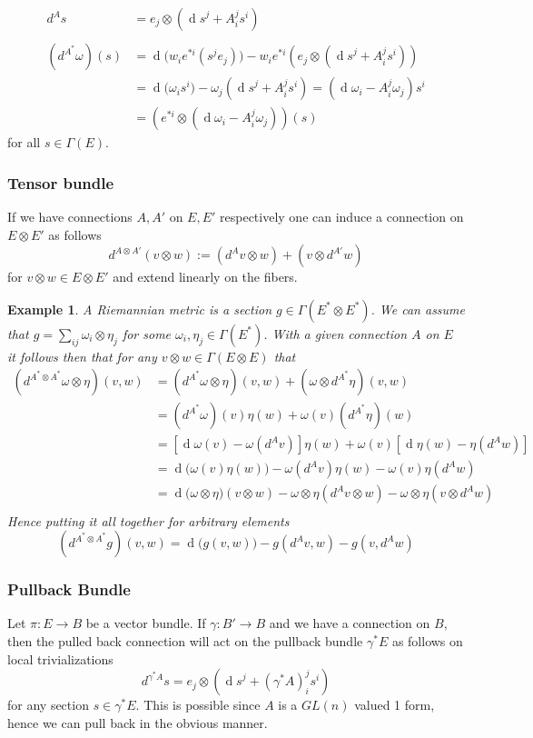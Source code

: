 \documentclass{article}
\numberwithin{theorem}{section}
\newtheorem*{example}{Example}
\renewcommand{\d}[1]{\ensuremath{\operatorname{d}\!{#1}}}
\newcommand{\1}{\mathds{1}}
\begin{document}
\begin{align*}
     d^A s &= e_j \otimes (\d s^j + A^{j}_i s^i ) \\ 
     \\
    (d^{A^*}\omega)(s) &= \d(w_ie^{*i}(s^je_j)) - w_i e^{*i}(e_j \otimes (\d s^j + A^j_i s^i)) \\
    &= \d(\omega_is^i) -\omega_j(\d s^j + A^j_i s^i)  = (\d \omega_i - A^{j}_i \omega_j) s^i \\
    &= \left( e^{*i}\otimes(\d \omega_i - A^j_i \omega_j)\right) (s)
\end{align*}
for all $ s\in \Gamma(E)$. 

\subsubsection{Tensor bundle}
If we have connections $A, A'$ on $E, E'$ respectively one can induce a connection on $E\otimes E'$ as follows 
\[ d^{A \otimes A'}(v \otimes w) := (d^A v \otimes w) + (v \otimes d^{A'} w)  \]
for $v \otimes w \in E\otimes E'$ and extend linearly on the fibers. 


\begin{example}
    A Riemannian metric is a section $g \in \Gamma(E^* \otimes E^*)$. We can assume that $g = \sum_{ij} \omega_i \otimes \eta_j $ for some $\omega_i, \eta_j \in \Gamma(E^{*})$. With a given connection $A$ on $E$ it follows then that for any $v \otimes w \in \Gamma(E \otimes E)$ that 
    \begin{align*} (d^{A^*\otimes A^*}\omega  \otimes \eta)(v,w) &= (d^{A^*}\omega \otimes \eta)(v,w) + (\omega \otimes d^{A^*}\eta )(v,w) \\ 
        &= (d^{A^*}\omega)(v) \eta(w) + \omega(v) (d^{A^*}\eta)(w) \\ 
        &= [\d \omega(v) - \omega(d^Av)]\eta(w) + \omega(v)[\d \eta(w) - \eta(d^Aw)] \\ 
        &= \d(\omega(v)\eta(w)) - \omega(d^Av)\eta(w) - \omega(v) \eta(d^Aw) \\ 
        &= \d ( \omega \otimes \eta)(v \otimes w) - \omega\otimes \eta(d^Av \otimes w) - \omega\otimes \eta(v \otimes d^A w) \\ 
    \end{align*}
    Hence putting it all together for arbitrary elements 
    \[ (d^{A^* \otimes A^*}g )(v,w) = \d(g(v,w)) - g(d^Av, w) - g(v, d^A w)\]
\end{example}

\subsubsection{Pullback Bundle}
Let $\pi: E \to B$ be a vector bundle. 
If $\gamma: B' \to B$ and we have a connection on $B$, then the pulled back connection will act on the pullback bundle 
$\gamma^*E$ as follows on local trivializations
\[ d^{\gamma^*A}s = e_j \otimes( \d s^j + (\gamma^* A)^j_i s^i) \]
for any section $s \in \gamma^*E$. This is possible since $A$ is a $GL(n)$ valued 1 form, hence we can pull back in the obvious manner. 
\end{document}
